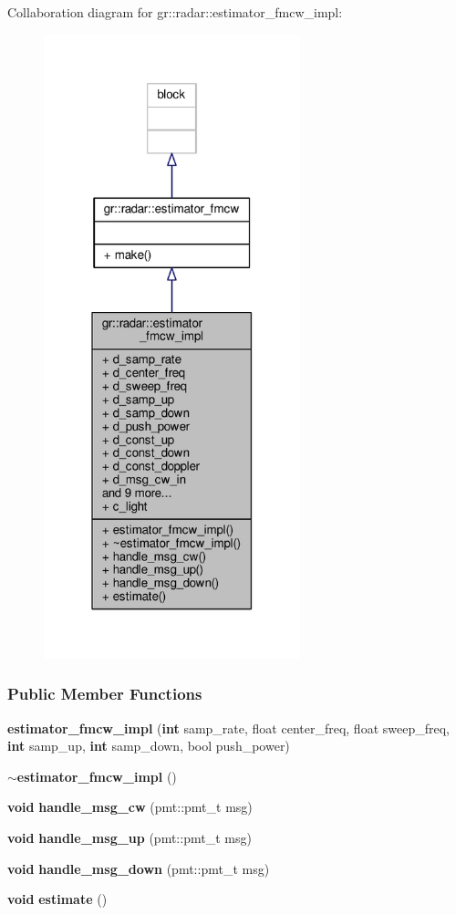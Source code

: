 Collaboration diagram for gr\+:\+:radar\+:\+:estimator\+\_\+fmcw\+\_\+impl\+:
\nopagebreak
\begin{figure}[H]
\begin{center}
\leavevmode
\includegraphics[width=211pt]{d4/de7/classgr_1_1radar_1_1estimator__fmcw__impl__coll__graph}
\end{center}
\end{figure}
\subsubsection*{Public Member Functions}
\begin{DoxyCompactItemize}
\item 
{\bf estimator\+\_\+fmcw\+\_\+impl} ({\bf int} samp\+\_\+rate, float center\+\_\+freq, float sweep\+\_\+freq, {\bf int} samp\+\_\+up, {\bf int} samp\+\_\+down, bool push\+\_\+power)
\item 
{\bf $\sim$estimator\+\_\+fmcw\+\_\+impl} ()
\item 
{\bf void} {\bf handle\+\_\+msg\+\_\+cw} (pmt\+::pmt\+\_\+t msg)
\item 
{\bf void} {\bf handle\+\_\+msg\+\_\+up} (pmt\+::pmt\+\_\+t msg)
\item 
{\bf void} {\bf handle\+\_\+msg\+\_\+down} (pmt\+::pmt\+\_\+t msg)
\item 
{\bf void} {\bf estimate} ()
\end{DoxyCompactItemize}
